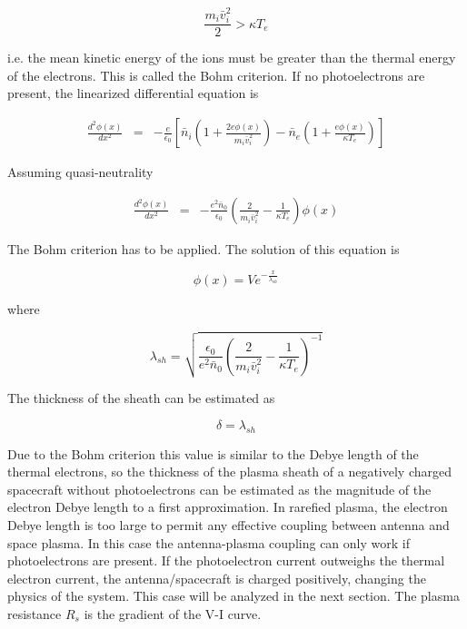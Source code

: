 \documentclass[a4paper,11pt]{thesis}
\begin{document}
\begin{equation}
    \frac{m_i\bar{v}_i^2}{2} > \kappa T_e
\end{equation}

i.e. the mean kinetic energy of the ions must be greater than the thermal energy of the electrons. This is called the Bohm criterion. If no photoelectrons are present, the linearized differential equation is

\begin{eqnarray}
    \frac{d^2\phi(x)}{dx^2}&=&-\frac{e}{\epsilon_0}\left[\bar{n}_i  \left(1+\frac{2e\phi(x)}{m_i\bar{v}_i^2}\right)  -\bar{n}_e \left( 1+\frac{e\phi(x)}{\kappa T_e} \right) \right]
\end{eqnarray}

Assuming quasi-neutrality

\begin{eqnarray}
    \frac{d^2\phi(x)}{dx^2}&=&-\frac{e^2\bar{n}_0}{\epsilon_0}\left( \frac{2}{m_i\bar{v}_i^2}  - \frac{1}{\kappa T_e} \right)\phi(x)
\end{eqnarray}

The Bohm criterion has to be applied. The solution of this equation is

\begin{equation}
    \phi(x)=Ve^{-\frac{x}{\lambda_{sh}}}
\end{equation}

where

\begin{equation}
    \lambda_{sh}=\sqrt{\frac{\epsilon_0}{e^2\bar{n}_0}\left( \frac{2}{m_i\bar{v}_i^2}  - \frac{1}{\kappa T_e} \right)^{-1}}
\end{equation}

The thickness of the sheath can be estimated as

\begin{equation}
\delta=\lambda_{sh}
\end{equation}

Due to the Bohm criterion this value is similar to the Debye length of the thermal electrons, so the thickness of the plasma sheath of a negatively charged spacecraft without photoelectrons can be estimated as the magnitude of the electron Debye length to a first approximation. In rarefied plasma, the electron Debye length is too large to permit any effective coupling between antenna and space plasma. In this case the antenna-plasma coupling can only work if photoelectrons are present. If the photoelectron current outweighs the thermal electron current, the antenna/spacecraft is charged positively, changing the physics of the system. This case will be analyzed in the next section. The plasma resistance $R_s$ is the gradient of the V-I curve.
\end{document}
